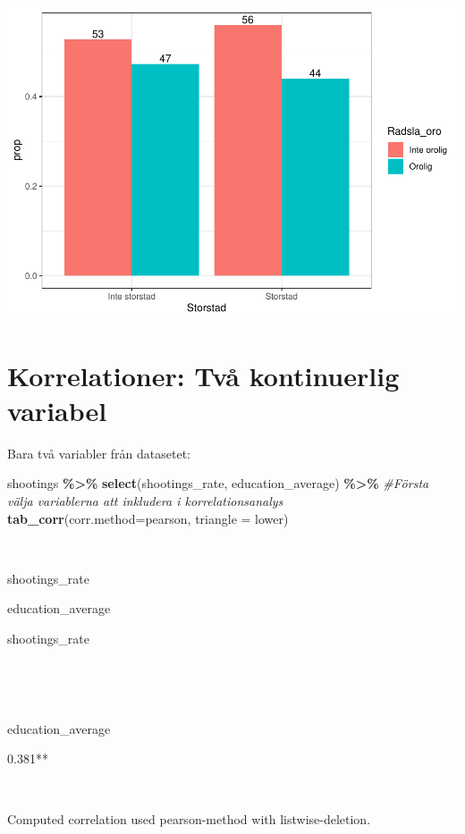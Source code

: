 \documentclass[
]{book}
\newenvironment{Shaded}{\begin{snugshade}}{\end{snugshade}}
\newcommand{\AttributeTok}[1]{\textcolor[rgb]{0.13,0.29,0.53}{#1}}
\newcommand{\CommentTok}[1]{\textcolor[rgb]{0.56,0.35,0.01}{\textit{#1}}}
\newcommand{\FunctionTok}[1]{\textcolor[rgb]{0.13,0.29,0.53}{\textbf{#1}}}
\newcommand{\NormalTok}[1]{#1}
\newcommand{\SpecialCharTok}[1]{\textcolor[rgb]{0.81,0.36,0.00}{\textbf{#1}}}
\newcommand{\StringTok}[1]{\textcolor[rgb]{0.31,0.60,0.02}{#1}}
\begin{document}
\includegraphics{_main_files/figure-latex/unnamed-chunk-21-1.pdf}

\section{Korrelationer: Två kontinuerlig variabel}\label{korrelationer-tvuxe5-kontinuerlig-variabel}

Bara två variabler från datasetet:

\begin{Shaded}
\begin{Highlighting}[]
\NormalTok{shootings }\SpecialCharTok{\%\textgreater{}\%} 
  \FunctionTok{select}\NormalTok{(shootings\_rate, education\_average) }\SpecialCharTok{\%\textgreater{}\%} \CommentTok{\#Första välja variablerna att inkludera i korrelationsanalys}
  \FunctionTok{tab\_corr}\NormalTok{(}\AttributeTok{corr.method=}\StringTok{\textquotesingle{}pearson\textquotesingle{}}\NormalTok{, }\AttributeTok{triangle =} \StringTok{\textquotesingle{}lower\textquotesingle{}}\NormalTok{)}
\end{Highlighting}
\end{Shaded}

~

shootings\_rate

education\_average

shootings\_rate

~

~

education\_average

0.381**

~

Computed correlation used pearson-method with listwise-deletion.
\end{document}
